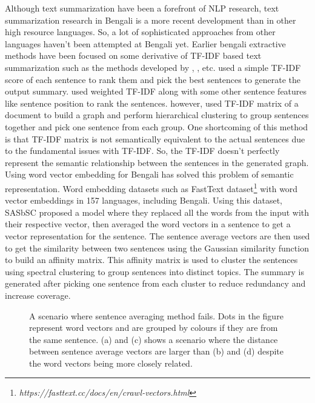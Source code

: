 Although text summarization have been a forefront of NLP research, text summarization research in Bengali is a more recent development than in other high resource languages. So, a lot of sophisticated approaches from other languages haven't been attempted at Bengali yet. Earlier bengali extractive methods have been focused on some derivative of TF-IDF based text summarization such as the methods developed by \citeauthor{chowdhury-etal-2021-tfidf-clustering} \cite{chowdhury-etal-2021-tfidf-clustering}, \citeauthor{das-2022-tfidf} \cite{das-2022-tfidf}, \citeauthor{sarkar-2012-tfidf} \cite{sarkar-2012-tfidf} etc. \citeauthor{sarkar-2012-tfidf} \cite{sarkar-2012-tfidf} used a simple TF-IDF score of each sentence to rank them and pick the best sentences to generate the output summary. \citeauthor{das-2022-tfidf} \cite{das-2022-tfidf} used weighted TF-IDF along with some other sentence features like sentence position to rank the sentences. \citeauthor{chowdhury-etal-2021-tfidf-clustering} \cite{chowdhury-etal-2021-tfidf-clustering} however, used TF-IDF matrix of a document to build a graph and perform hierarchical clustering to group sentences together and pick one sentence from each group. One shortcoming of this method is that TF-IDF matrix is not semantically equivalent to the actual sentences due to the fundamental issues with TF-IDF. So, the TF-IDF doesn't perfectly represent the semantic relationship between the sentences in the generated graph. Using word vector embedding for Bengali has solved this problem of semantic representation. Word embedding datasets such as FastText \cite{grave-etal-2018-fasttext} dataset\footnote{\textit{https://fasttext.cc/docs/en/crawl-vectors.html}} with word vector embeddings in 157 languages, including Bengali. Using this dataset, SASbSC \cite{roychowdhury-etal-2022-spectral-base} proposed a model where they replaced all the words from the input with their respective vector, then averaged the word vectors in a sentence to get a vector representation for the sentence. The sentence average vectors are then used to get the similarity between two sentences using the Gaussian similarity function to build an affinity matrix. This affinity matrix is used to cluster the sentences using spectral clustering to group sentences into distinct topics. The summary is generated after picking one sentence from each cluster to reduce redundancy and increase coverage.\\

\begin{figure}
    \centering
    
    \caption{A scenario where sentence averaging method fails. Dots in the figure represent word vectors and are grouped by colours if they are from the same sentence. (a) and (c) shows a scenario where the distance between sentence average vectors are larger than (b) and (d) despite the word vectors being more closely related.}
    \label{fig:sarkar-problem}
\end{figure}

